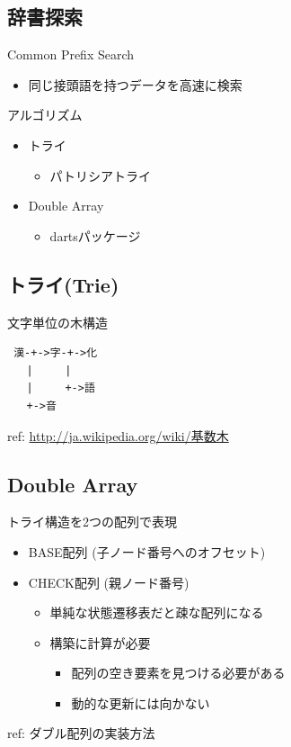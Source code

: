 \documentclass[mingoth,a4paper]{jsarticle}
\begin{document}
\subsection{辞書探索}

 Common Prefix Search
\begin{itemize}
 \item 同じ接頭語を持つデータを高速に検索
\end{itemize}  

アルゴリズム
\begin{itemize}
\item トライ
 \begin{itemize}
  \item パトリシアトライ
 \end{itemize}
 \item Double Array
   \begin{itemize}
   \item dartsパッケージ
   \end{itemize}
\end{itemize}

\subsection{トライ(Trie)}

文字単位の木構造

\begin{verbatim}
 漢-+->字-+->化
   |　　　|
   |     +->語
   +->音
\end{verbatim}

ref: \url{http://ja.wikipedia.org/wiki/基数木}

\subsection{Double Array}

 トライ構造を2つの配列で表現

\begin{itemize}
\item BASE配列 (子ノード番号へのオフセット)
\item CHECK配列 (親ノード番号)
  \begin{itemize}
  \item 単純な状態遷移表だと疎な配列になる
  \item 構築に計算が必要
    \begin{itemize}
    \item 配列の空き要素を見つける必要がある
    \item 動的な更新には向かない
    \end{itemize}
  \end{itemize}
\end{itemize}
ref: ダブル配列の実装方法
\end{document}
